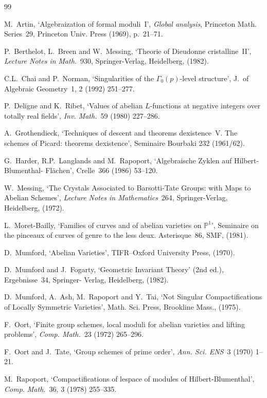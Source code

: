 \documentclass[11pt,a4paper]{article}
\theoremstyle{plain}
\theoremstyle{definition}
\begin{document}
\begin{thebibliography}{99}

M.~Artin, `Algebraization of formal moduli~I', \textit{Global analysis}, Princeton Math. Series~29,
Princeton Univ. Press (1969), p.~21--71.

P.~Berthelot, L.~Breen and W.~Messing, `Theorie of Dieudonne cristalline~II', \textit{Lecture Notes in}
\textit{Math.}~930, Springer-Verlag, Heidelberg, (1982).

C.L.~Chai and P.~Norman, `Singularities of the $\Gamma_0(p)$-level structure', J.~of Algebraic
Geometry~1, 2 (1992) 251--277.

P.~Deligne and K.~Ribet, `Values of abelian $L$-functions at negative integers over totally real
fields', \textit{Inv. Math.}~59 (1980) 227--286.

A.~Grothendieck, `Techniques of descent and theorems dexistence~V. The schemes of
Picard: theorems dexistence', Seminaire Bourbaki 232 (1961/62).

G.~Harder, R.P.~Langlands and M.~Rapoport, `Algebraische Zyklen auf Hilbert-Blumenthal-
Fl\"achen', Crelle~366 (1986) 53--120.

W.~Messing, `The Crystals Associated to Barsotti-Tate Groups: with Maps to
Abelian Schemes', \textit{Lecture Notes in Mathematics}~264, Springer-Verlag, Heidelberg, (1972).

L.~Moret-Bailly, `Families of curves and of abelian varieties on $\mathbb{P}^1$', Seminaire on the
pinceaux of curves of genre to the less deux. Asterisque~86, SMF, (1981).

D.~Mumford, `Abelian Varieties', TIFR--Oxford University Press, (1970).

D.~Mumford and J.~Fogarty, `Geometric Invariant Theory' (2nd ed.), Ergebnisse~34, Springer-
Verlag, Heidelberg, (1982).

D.~Mumford, A.~Ash, M.~Rapoport and Y.~Tai, `Not Singular Compactifications of Locally
Symmetric Varieties', Math. Sci. Press, Brookline Mass., (1975).

F.~Oort, `Finite group schemes, local moduli for abelian varieties and lifting problems',
\textit{Comp. Math.}~23 (1972) 265--296.

F.~Oort and J.~Tate, `Group schemes of prime order', \textit{Ann. Sci. ENS}~3 (1970) 1--21.

M.~Rapoport, `Compactifications of lespace of modules of Hilbert-Blumenthal', \textit{Comp.}
\textit{Math.}~36, 3 (1978) 255--335.

\end{thebibliography}
\end{document}
